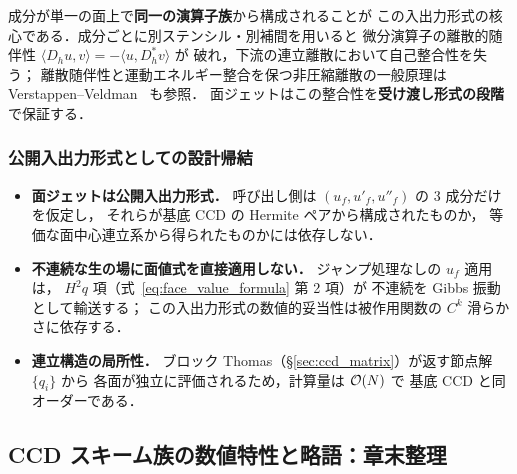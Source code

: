  成分が単一の面上で\textbf{同一の演算子族}から構成されることが
この入出力形式の核心である．成分ごとに別ステンシル・別補間を用いると
微分演算子の離散的随伴性 $\langle D_h u, v\rangle = -\langle u, D_h^{*} v\rangle$ が
破れ，下流の連立離散において自己整合性を失う；
離散随伴性と運動エネルギー整合を保つ非圧縮離散の一般原理は
Verstappen--Veldman~\cite{VerstappenVeldman2003} も参照．
面ジェットはこの整合性を\textbf{受け渡し形式の段階}で保証する．

\subsubsection{公開入出力形式としての設計帰結}
\label{sec:face_jet_design_consequences}

\begin{itemize}
  \item \textbf{面ジェットは公開入出力形式．}
        呼び出し側は $(u_f, u'_f, u''_f)$ の 3 成分だけを仮定し，
        それらが基底 CCD の Hermite ペアから構成されたものか，
        等価な面中心連立系から得られたものかには依存しない．
  \item \textbf{不連続な生の場に面値式を直接適用しない．}
        ジャンプ処理なしの $u_f$ 適用は，
        $H^2 q$ 項（式~\eqref{eq:face_value_formula} 第 2 項）が
        不連続を Gibbs 振動として輸送する；
        この入出力形式の数値的妥当性は被作用関数の $C^k$ 滑らかさに依存する．
  \item \textbf{連立構造の局所性．}
        ブロック Thomas（§\ref{sec:ccd_matrix}）が返す節点解 $\{q_i\}$ から
        各面が独立に評価されるため，計算量は $\mathcal{O}(N)$ で
        基底 CCD と同オーダーである．
\end{itemize}

\label{sec:face_jet_hfe}%
\label{sec:face_jet_ppe}%
\label{eq:hfe_upwind_plus}%
\label{eq:hfe_upwind_minus}%
\label{eq:face_ppe_flux}%

\subsection{CCD スキーム族の数値特性と略語：章末整理}
\label{sec:ccd_summary}

